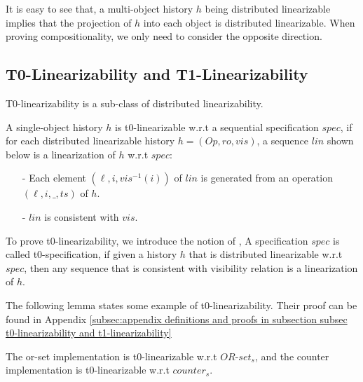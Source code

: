 It is easy to see that, a multi-object history $h$ being distributed linearizable implies that the projection of $h$ into each object is distributed linearizable. When proving compositionality, we only need to consider the opposite direction.




\subsection{T0-Linearizability and T1-Linearizability}
\label{subsec:t0-linearizability and t1-linearizability}

T0-linearizability is a sub-class of distributed linearizability.

\begin{definition}[t0-linearizability]
\label{definition:t0-ilnearizability}
A single-object history $h$ is t0-linearizable w.r.t a sequential specification $\mathit{spec}$, if for each distributed linearizable history $h=(\mathit{Op},\mathit{ro},\mathit{vis})$, a sequence $\mathit{lin}$ shown below is a linearization of $h$ w.r.t $\mathit{spec}$:

\begin{itemize}
\setlength{\itemsep}{0.5pt}
\item[-] Each element $(\ell,i,\mathit{vis}^{-1}(i))$ of $\mathit{lin}$ is generated from an operation $(\ell,i,\_,\mathit{ts})$ of $h$.

\item[-] $\mathit{lin}$ is consistent with $\mathit{vis}$.
\end{itemize}
\end{definition} 

To prove t0-linearizability, we introduce the notion of , A specification $\mathit{spec}$ is called t0-specification, if given a history $h$ that is distributed linearizable w.r.t $\mathit{spec}$, then any sequence that is consistent with visibility relation is a linearization of $h$.



The following lemma states some example of t0-linearizability. Their proof can be found in Appendix \ref{subsec:appendix definitions and proofs in subsection subsec t0-linearizability and t1-linearizability}

\begin{lemma}
\label{lemma:several t0-specifications}
The or-set implementation is t0-linearizable w.r.t $\mathit{OR}$-$\mathit{set}_s$, and the counter implementation is t0-linearizable w.r.t $\mathit{counter}_s$.
\end{lemma}





